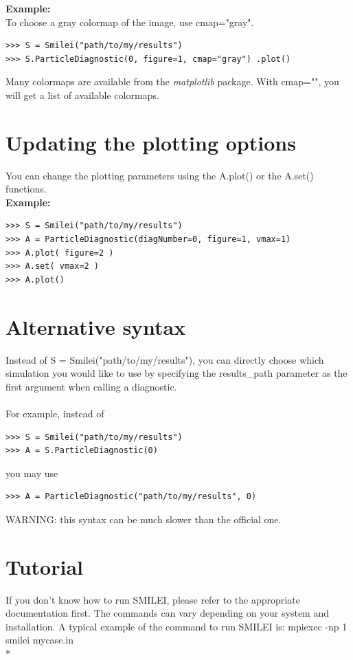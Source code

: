 \documentclass[11pt]{article}
\newcommand{\code}[1]{\colorbox{yellow!15}{\ttfamily #1}}
\begin{document}
\textbf{Example:}\\
To choose a gray colormap of the image, use \code{cmap="gray"}.
\begin{lstlisting}
>>> S = Smilei("path/to/my/results")
>>> S.ParticleDiagnostic(0, figure=1, cmap="gray") .plot()
\end{lstlisting}
Many colormaps are available from the \textit{matplotlib} package. With \code{cmap=""}, you will get a list of available colormaps.


\section{Updating the plotting options}

You can change the plotting parameters using the \code{A.plot()} or the \code{A.set()} functions.\\
\textbf{Example:}
\begin{lstlisting}
>>> S = Smilei("path/to/my/results")
>>> A = ParticleDiagnostic(diagNumber=0, figure=1, vmax=1)
>>> A.plot( figure=2 )
>>> A.set( vmax=2 )
>>> A.plot()
\end{lstlisting}


\section{Alternative syntax}

Instead of \code{S = Smilei("path/to/my/results")}, you can directly choose which simulation you would like to use
by specifying the \code{results\_path} parameter as the first argument when calling a diagnostic.\\
\\
For example, instead of 
\begin{lstlisting}
>>> S = Smilei("path/to/my/results")
>>> A = S.ParticleDiagnostic(0)
\end{lstlisting}
you may use
\begin{lstlisting}
>>> A = ParticleDiagnostic("path/to/my/results", 0)
\end{lstlisting}

WARNING: this syntax can be much slower than the official one.

\clearpage


\section{Tutorial}

If you don't know how to run SMILEI, please refer to the appropriate documentation first. The commands can vary depending on your system and installation. A typical example of the command to run SMILEI is: \code{mpiexec -np 1 smilei mycase.in}\\*
\end{document}
